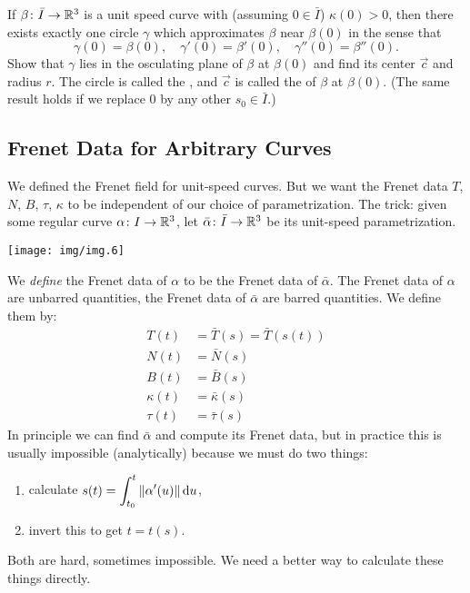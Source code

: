 \begin{enumerate}
If $\beta\colon\bar{I}\to\mathbb{R}^{3}$ is a unit speed curve with (assuming
$0\in\bar{I}$) $\kappa(0)>0$, then there exists exactly one circle
$\gamma$ which approximates $\beta$ near $\beta(0)$ in the sense that
\begin{equation}
\gamma(0) = \beta(0),\quad\gamma'(0)=\beta'(0),\quad\gamma''(0)=\beta''(0).
\end{equation}
Show that $\gamma$ lies in the osculating plane of $\beta$ at $\beta(0)$
and find its center $\vec{c}$ and radius $r$. The circle is called the
, and $\vec{c}$ is called the  of $\beta$ at $\beta(0)$.
(The same result holds if we replace $0$ by any other $s_{0}\in\bar{I}$.)
\end{enumerate}

\vfill\eject


\subsection{Frenet Data for Arbitrary Curves}

\M
We defined the Frenet field for unit-speed curves. But we want the
Frenet data $T$, $N$, $B$, $\tau$, $\kappa$ to be independent of our
choice of parametrization. The trick: given some regular curve
$\alpha\colon I\to\mathbb{R}^{3}$, let $\bar{\alpha}\colon \bar{I}\to\mathbb{R}^{3}$
be its unit-speed parametrization. 
\begin{center}
  \texttt{[image: img/img.6]}
\end{center}
We \emph{define} the Frenet data of $\alpha$ to be the Frenet data of
$\bar{\alpha}$. The Frenet data of $\alpha$ are unbarred quantities, the
Frenet data of $\bar{\alpha}$ are barred quantities. We define them by:
\begin{subequations}
  \begin{align}
    T(t) &= \bar{T}(s) = \bar{T}(s(t))\\
    N(t) &= \bar{N}(s)\\
    B(t) &= \bar{B}(s)\\
    \kappa(t) &= \bar{\kappa}(s)\\
    \tau(t) &= \bar{\tau}(s)
  \end{align}
\end{subequations}
In principle we can find $\bar{\alpha}$ and compute its Frenet data, but
in practice this is usually impossible (analytically) because we must do
two things:
\begin{enumerate}
\item calculate $\displaystyle s(t)=\int^{t}_{t_{0}}\|\alpha'(u)\|\,\mathrm{d} u$,
\item invert this to get $t = t(s)$.
\end{enumerate}
Both are hard, sometimes impossible. We need a better way to calculate
these things directly.

